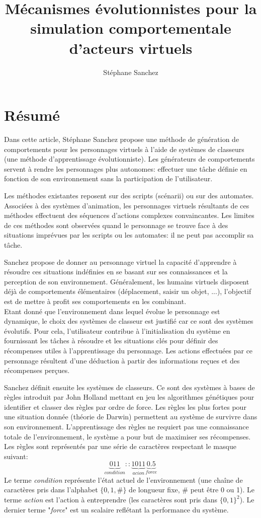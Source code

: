 \documentclass[11pt]{article}
\title{Mécanismes évolutionnistes pour la simulation comportementale d'acteurs virtuels}
\author{Stéphane Sanchez}
\date{
	\begin{center}
		PhD Thesis IRIT UT1 Social Sciences \\
		Année 2004
	\end{center}
}
\begin{document}
\maketitle

\section*{Résumé}

Dans cette article, Stéphane Sanchez propose une méthode de génération de comportements pour les personnages virtuels à l'aide de systèmes de classeurs (une méthode d'apprentissage évolutionniste). Les générateurs de comportements servent à rendre les personnages plus autonomes: effectuer une tâche définie en fonction de son environnement sans la participation de l'utilisateur.

Les méthodes existantes reposent sur des scripts (scénarii) ou sur des automates. Associées à des systèmes d'animation, les personnages virtuels résultants de ces méthodes effectuent des séquences d'actions complexes convaincantes. Les limites de ces méthodes sont observées quand le personnage se trouve face à des situations imprévues par les scripts ou les automates: il ne peut pas accomplir sa tâche.

Sanchez propose de donner au personnage virtuel la capacité d'apprendre à résoudre ces situations indéfinies en se basant sur ses connaissances et la perception de son environnement. Généralement, les humains virtuels disposent déjà de comportements élémentaires (déplacement, saisir un objet, ...), l'objectif est de mettre à profit ses comportements en les combinant.\\
Etant donné que l'environnement dans lequel évolue le personnage est dynamique, le choix des systèmes de classeur est justifié car ce sont des systèmes évolutifs. Pour cela, l'utilisateur contribue à l'initialisation du système en fournissant les tâches à résoudre et les situations clés pour définir des récompenses utiles à l'apprentissage du personnage. Les actions effectuées par ce personnage résultent d'une déduction à partir des informations reçues et des récompenses perçues.

Sanchez définit ensuite les systèmes de classeurs. Ce sont des systèmes à bases de règles introduit par John Holland mettant en jeu les algorithmes génétiques pour identifier et classer des règles par ordre de force. Les règles les plus fortes pour une situation donnée (théorie de Darwin) permettent au système de survivre dans son environnement. L'apprentissage des règles ne requiert pas une connaissance totale de l'environnement, le système a pour but de maximiser ses récompenses. Les règles sont représentés par une série de caractères respectant le masque suivant:
\[
\underbrace{011}_{condition}:: \underbrace{1011}_{acion} \underbrace{0.5}_{force}
\]
Le terme \textit{condition} représente l'état actuel de l'environnement (une chaîne de caractères pris dans l'alphabet $\{0,1,\#\}$ de longueur fixe, \# peut être 0 ou 1). Le terme \textit{action} est l'action à entreprendre (les caractères sont pris dans $ \{0, 1\}^2$). Le dernier terme "\textit{force}" est un scalaire reflétant la performance du système.
\end{document}
